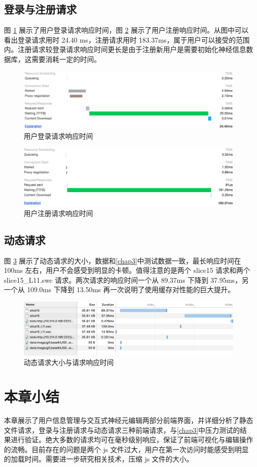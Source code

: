 \subsection{登录与注册请求}
图 \ref{login-res} 展示了用户登录请求响应时间，图 \ref{signup-res} 展示了用户注册响应时间。从图中可以看出登录请求用时 24.40 ms，注册请求用时 183.37ms，属于用户可以接受的范围内。注册请求较登录请求响应时间更长是由于注册新用户是需要初始化神经信息数据库，这需要消耗一定的时间。

\begin{figure}[!ht]
\centering
\includegraphics[width=128mm]{images/login-res}
\caption{用户登录请求响应时间}
\label{login-res}
\end{figure}

\begin{figure}[!ht]
\centering
\includegraphics[width=128mm]{images/signup-res}
\caption{用户注册请求响应时间}
\label{signup-res}
\end{figure}

\subsection{动态请求}
图 \ref{dy-res} 展示了动态请求的大小，数据和\ref{chap3}中测试数据一致，最长响应时间在 100ms 左右，用户不会感受到明显的卡顿。值得注意的是两个 slice15 请求和两个 slice15\_L11.swc 请求。两次请求的响应时间一个从 89.37ms 下降到 37.95ms，另一个从 109.0ms 下降到 13.50ms 再一次说明了使用缓存对性能的巨大提升。

\begin{figure}[!ht]
\centering
\includegraphics[width=148mm]{images/dy-res}
\caption{动态请求大小与请求响应时间}
\label{dy-res}
\end{figure}

\section{本章小结}
本章展示了用户信息管理与交互式神经元编辑两部分前端界面，并详细分析了静态文件请求，登录与注册请求与动态请求三种前端请求，与\ref{chap3}中压力测试的结果进行验证。绝大多数的请求均可在毫秒级别响应，保证了前端可视化与编辑操作的流畅。目前存在的问题是两个 js 文件过大，用户在第一次访问时能感受到明显的加载时间。需要进一步研究相关技术，压缩 js 文件的大小。